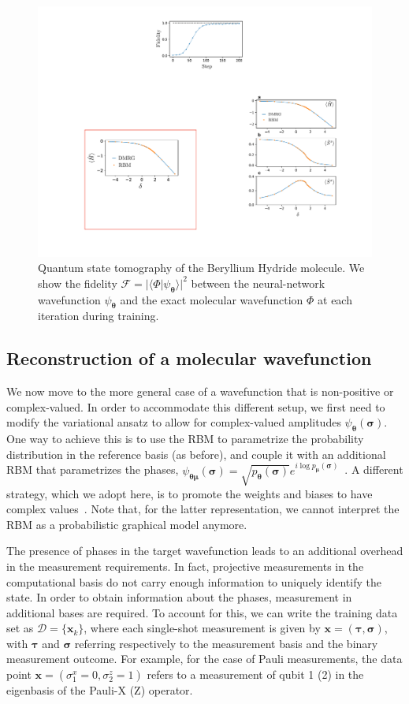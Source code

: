 \documentclass[twocolumn,english,reprint,superscriptaddress,longbibliography,pra]{revtex4-1}
\begin{document}
\begin{figure}[t]
\noindent \centering{}\includegraphics[width=\columnwidth]{fig_qst_beryllium}
\caption{Quantum state tomography of the Beryllium Hydride molecule. We show the fidelity $\mathcal{F} = |\langle\Phi|\psi_{\bm\theta}\rangle|^2$ between the neural-network wavefunction $\psi_{\bm\theta}$ and the exact molecular wavefunction $\Phi$ at each iteration during training.}
\label{Fig::QST_beryllium} 
\end{figure}

\subsection{Reconstruction of a molecular wavefunction}
We now move to the more general case of a wavefunction that is non-positive or complex-valued. In order to accommodate this different setup, we first need to modify the variational ansatz to allow for complex-valued amplitudes $\psi_{\bm\theta}(\bm\sigma)$. One way to achieve this is to use the RBM to parametrize the probability distribution in the reference basis (as before), and couple it with an additional RBM that parametrizes the phases, $\psi_{\bm\theta\bm\mu}(\bm\sigma)=\sqrt{p_{\bm\theta}(\bm\sigma)}e^{i\log p_{\bm\mu}(\bm\sigma)}$~\cite{torlai_Tomo}. A different strategy, which we adopt here, is to promote the weights and biases to have complex values~\cite{Carleo_2017}. Note that, for the latter representation, we cannot interpret the RBM as a probabilistic graphical model anymore. 

The presence of phases in the target wavefunction leads to an additional overhead in the measurement requirements. In fact, projective measurements in the computational basis do not carry enough information to uniquely identify the state. In order to obtain information about the phases, measurement in additional bases are required. To account for this, we can write the training data set as $\mathcal{D}=\{\bm{x}_k\}$, where each single-shot measurement is given by $\bm{x}=(\bm{\tau},\bm{\sigma})$, with $\bm\tau$ and $\bm\sigma$ referring respectively to the measurement basis and the binary measurement outcome. For example, for the case of Pauli measurements, the data point $\bm{x} = (\sigma_1^x=0,\sigma^z_2=1)$ refers to a measurement of qubit 1 (2) in the eigenbasis of the Pauli-X (Z) operator.
\end{document}

